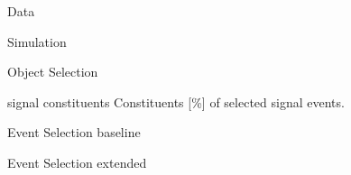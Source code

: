 \begin{frame}{Data}
\smaller
    \begin{center}
    \resizebox{0.7\textwidth}{!}{}
    \end{center}
\end{frame}


\begin{frame}{Simulation}
\smaller
    \begin{center}
    \resizebox{0.6\textwidth}{!}{}
    \end{center}
\end{frame}


\begin{frame}{Object Selection}
\smaller
    \begin{table}
        \centering
        \setlength{\tabcolsep}{1em}
        \renewcommand{\arraystretch}{1.5}
        \resizebox{0.95\textwidth}{!}{}
    \end{table}
\end{frame}


\begin{frame}{signal constituents}
Constituents [\%] of selected signal events.
    \begin{table}
        \centering
        \setlength{\tabcolsep}{1em}
        \renewcommand{\arraystretch}{2}
        \resizebox{0.96\textwidth}{!}{}
    \end{table}
\end{frame}

\begin{frame}{Event Selection baseline}
    \begin{table}
        \centering
        \setlength{\tabcolsep}{1em}
        \renewcommand{\arraystretch}{2}
        \resizebox{0.99\textwidth}{!}{}
    \end{table}
\end{frame}



\begin{frame}{Event Selection extended}
    \begin{table}
        \centering
        \setlength{\tabcolsep}{1em}
        \renewcommand{\arraystretch}{2}
        \resizebox{0.99\textwidth}{!}{}
    \end{table}
\end{frame}


